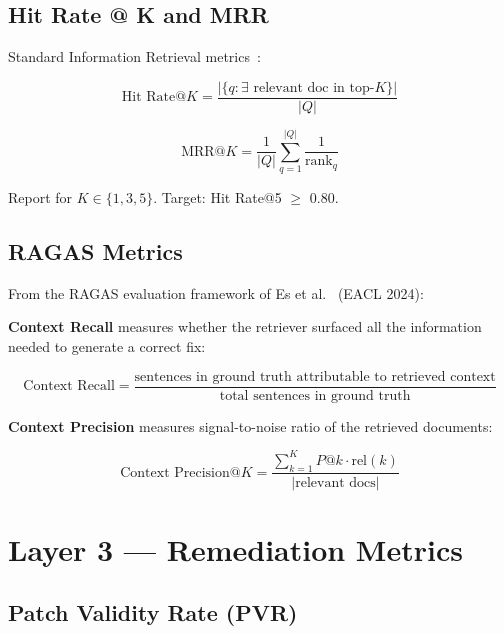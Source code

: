 \documentclass[12pt, a4paper]{report}
\begin{document}
\subsection{Hit Rate @ K and MRR}

Standard Information Retrieval metrics~\citep{manning2008ir}:

\begin{equation}
  \text{Hit Rate@}K = \frac{|\{q : \exists \text{ relevant doc in top-}K\}|}{|Q|}
  \label{eq:hitrate}
\end{equation}

\begin{equation}
  \text{MRR@}K = \frac{1}{|Q|} \sum_{q=1}^{|Q|} \frac{1}{\text{rank}_q}
  \label{eq:mrr}
\end{equation}

Report for $K \in \{1, 3, 5\}$. Target: Hit Rate@5 $\geq$ 0.80.

\subsection{RAGAS Metrics}

From the RAGAS evaluation framework of Es et al.~\citep{es2024ragas} (EACL 2024):

\textbf{Context Recall} measures whether the retriever surfaced all the information
needed to generate a correct fix:

\begin{equation}
  \text{Context Recall} =
  \frac{\text{sentences in ground truth attributable to retrieved context}}
       {\text{total sentences in ground truth}}
  \label{eq:context_recall}
\end{equation}

\textbf{Context Precision} measures signal-to-noise ratio of the retrieved documents:

\begin{equation}
  \text{Context Precision@}K =
  \frac{\sum_{k=1}^{K} P@k \cdot \text{rel}(k)}{|\text{relevant docs}|}
  \label{eq:context_precision}
\end{equation}

\section{Layer 3 --- Remediation Metrics}

\subsection{Patch Validity Rate (PVR)}
\end{document}
